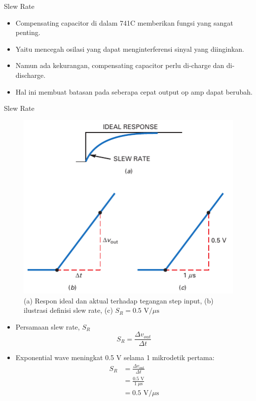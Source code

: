 \begin{frame}{Slew Rate}
	\begin{itemize}
		\item Compensating capacitor di dalam 741C memberikan fungsi yang sangat penting.
		\item Yaitu mencegah osilasi yang dapat menginterferensi sinyal yang diinginkan.
		\item Namun ada kekurangan, compensating capacitor perlu di-charge dan di-discharge.
		\item Hal ini membuat batasan pada seberapa cepat output op amp dapat berubah.
	\end{itemize}
\end{frame}

\begin{frame}{Slew Rate}
	\begin{multicols}{2}
		\begin{figure}
			\centering
			\includegraphics[width=0.8\linewidth]{gambar/fig-16.08}
			\caption{(a) Respon ideal dan aktual terhadap tegangan step input, (b) ilustrasi definisi slew rate, (c) $ S_R = 0.5 \text{ V/}\mu\text{s} $}
			\label{fig-16.08}
		\end{figure}
		\columnbreak
		\begin{itemize}
			\item Persamaan slew rate, $ S_R $
			\begin{equation}\label{pers.16.1}
				S_R = \frac{\Delta v_{out}}{\Delta t}
			\end{equation}
			\item Exponential wave meningkat 0.5 V selama 1 mikrodetik pertama:
			\begin{align*}
				S_R &= \frac{\Delta v_{out}}{\Delta t} \\
				&= \frac{0.5 \text{ V}}{1~\mu\text{s}} \\
				&= 0.5 \text{ V/}\mu\text{s}
			\end{align*}
		\end{itemize}
	\end{multicols}
\end{frame}

